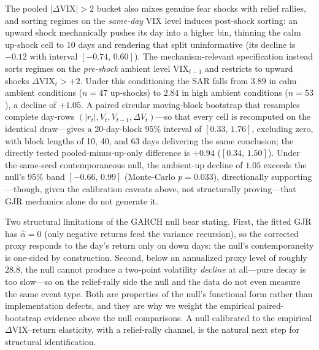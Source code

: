 \documentclass[12pt,a4paper]{article}
\begin{document}
The pooled $|\Delta\text{VIX}| > 2$ bucket also mixes genuine fear shocks with relief rallies, and sorting regimes on the \textit{same-day} VIX level induces post-shock sorting: an upward shock mechanically pushes its day into a higher bin, thinning the calm up-shock cell to 10 days and rendering that split uninformative (its decline is $-0.12$ with interval $[-0.74,\,0.60]$).
The mechanism-relevant specification instead sorts regimes on the \textit{pre-shock} ambient level $\text{VIX}_{t-1}$ and restricts to upward shocks $\Delta\text{VIX}_t > +2$. Under this conditioning the SAR falls from $3.89$ in calm ambient conditions ($n = 47$ up-shocks) to $2.84$ in high ambient conditions ($n = 53$), a decline of $+1.05$. A paired circular moving-block bootstrap that resamples complete day-rows $(|r_t|, V_t, V_{t-1}, \Delta V_t)$---so that every cell is recomputed on the identical draw---gives a 20-day-block 95\% interval of $[0.33,\,1.76]$, excluding zero, with block lengths of 10, 40, and 63 days delivering the same conclusion; the directly tested pooled-minus-up-only difference is $+0.94$ ($[0.34,\,1.50]$).
Under the same-seed contemporaneous null, the ambient-up decline of $1.05$ exceeds the null's 95\% band $[-0.66,\,0.99]$ (Monte-Carlo $p = 0.033$), directionally supporting---though, given the calibration caveats above, not structurally proving---that GJR mechanics alone do not generate it.

Two structural limitations of the GARCH null bear stating. First, the fitted GJR has $\hat{\alpha} = 0$ (only negative returns feed the variance recursion), so the corrected proxy responds to the day's return only on down days: the null's contemporaneity is one-sided by construction. Second, below an annualized proxy level of roughly $28.8$, the null cannot produce a two-point volatility \textit{decline} at all---pure decay is too slow---so on the relief-rally side the null and the data do not even measure the same event type.
Both are properties of the null's functional form rather than implementation defects, and they are why we weight the empirical paired-bootstrap evidence above the null comparisons. A null calibrated to the empirical $\Delta\text{VIX}$--return elasticity, with a relief-rally channel, is the natural next step for structural identification.
\end{document}
